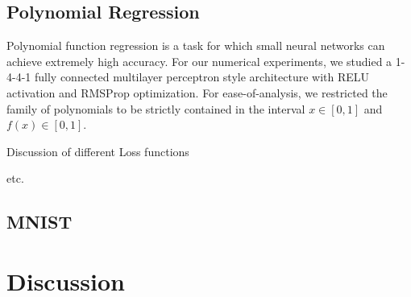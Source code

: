 \documentclass[twocolumn,superscriptaddress,aps,prb,floatfix]{revtex4-1}
\begin{document}
\subsection{Polynomial Regression}
\label{sec:PolyFuncs}

 Polynomial function regression is a task for which small neural networks can achieve extremely high accuracy.  For our numerical experiments, we studied a 1-4-4-1 fully connected multilayer perceptron style architecture with RELU activation and RMSProp optimization.  For ease-of-analysis, we restricted the family of polynomials to be strictly contained in the interval $x\in[0,1]$ and $f(x)\in[0,1]$.
 
 Discussion of different Loss functions
 
 etc.


\subsection{MNIST}
\label{sec:MNIST}


\section{Discussion}
\label{sec:Discussion}

 
 


\end{document}
